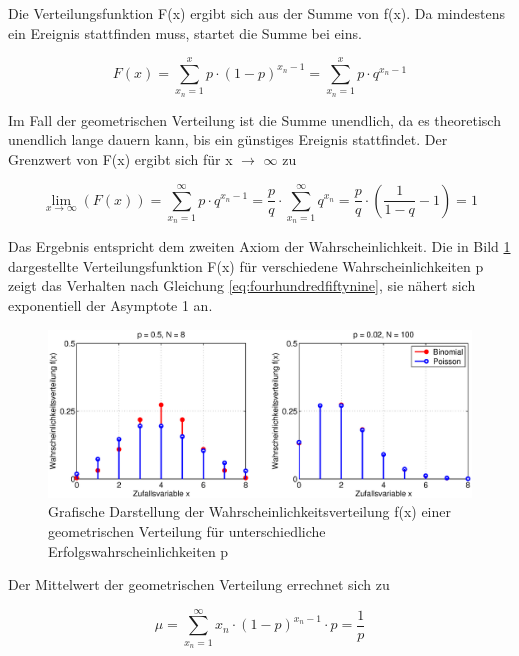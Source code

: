 \noindent Die Verteilungsfunktion F(x) ergibt sich aus der Summe von f(x). Da mindestens ein Ereignis stattfinden muss, startet die Summe bei eins.

\begin{equation}\label{eq:fourhundredfiftyeight}
F(x)=\sum _{x_{n} =1}^{x}p\cdot (1-p)^{x_{n} -1}  =\sum _{x_{n} =1}^{x}p\cdot q^{x_{n} -1}
\end{equation}

\noindent Im Fall der geometrischen Verteilung ist die Summe unendlich, da es theoretisch unendlich lange dauern kann, bis ein g\"{u}nstiges Ereignis stattfindet. Der Grenzwert von F(x) ergibt sich f\"{u}r x $\rightarrow$ $\infty$ zu

\begin{equation}\label{eq:fourhundredfiftynine}
{\mathop{\lim }\limits_{x\to \infty }} \left(F\left(x\right)\right)=\sum _{x_{n} =1}^{\infty }p\cdot q^{x_{n} -1}  =\dfrac{p}{q} \cdot \sum _{x_{n} =1}^{\infty }q^{x_{n} }  =\dfrac{p}{q} \cdot \left(\dfrac{1}{1-q} -1\right)=1
\end{equation}

\noindent Das Ergebnis entspricht dem zweiten Axiom der Wahrscheinlichkeit. Die in Bild \ref{fig:Diskret_Geometrische2} dargestellte Verteilungsfunktion F(x) f\"{u}r verschiedene Wahrscheinlichkeiten p zeigt das Verhalten nach Gleichung \eqref{eq:fourhundredfiftynine}, sie n\"{a}hert sich exponentiell der Asymptote 1 an.

\noindent 
\begin{figure}[H]
  \centerline{\includegraphics[width=1\textwidth]{Kapitel4/Bilder/image17}}
  \caption{Grafische Darstellung der Wahrscheinlichkeitsverteilung f(x) einer geometrischen Verteilung f\"{u}r unterschiedliche Erfolgswahrscheinlichkeiten p}
  \label{fig:Diskret_Geometrische2}
\end{figure}

\noindent Der Mittelwert der geometrischen Verteilung errechnet sich zu

\begin{equation}\label{eq:fourhundredsixty}
\mu =\sum _{x_{n} =1}^{\infty }x_{n} \cdot (1-p)^{x_{n} -1} \cdot p =\dfrac{1}{p}
\end{equation}

